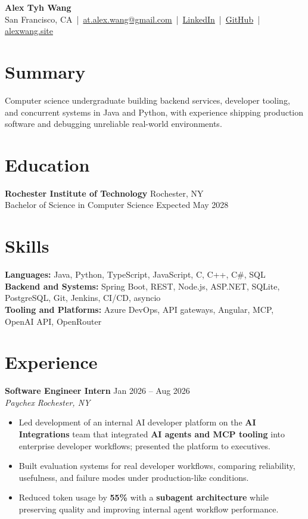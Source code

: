 \documentclass[10pt,letterpaper]{article}
\newif\ifresumeFirstRole
\newcommand{\resumeRole}[4]{%
  \ifresumeFirstRole
    \global\resumeFirstRolefalse
  \else
    \vspace{0pt plus 1fill}%
  \fi
  \textbf{#1} \hfill #2\\
  \textit{#3} \hfill \textit{#4}
}
\begin{document}
\begin{center}
{\Large \textbf{Alex Tyh Wang}}\\
San Francisco, CA \,|\, \href{mailto:at.alex.wang@gmail.com}{at.alex.wang@gmail.com} \,|\, \href{https://www.linkedin.com/in/alex-tyh-wang/}{LinkedIn} \,|\, \href{https://github.com/alextyhwang}{GitHub} \,|\, \href{https://alexwang.site}{alexwang.site}
\end{center}

\section*{Summary}
Computer science undergraduate building backend services, developer tooling, and concurrent systems in Java and Python, with experience shipping production software and debugging unreliable real-world environments.

\section*{Education}
\textbf{Rochester Institute of Technology} \hfill Rochester, NY\\
Bachelor of Science in Computer Science \hfill Expected May 2028

\section*{Skills}
\textbf{Languages:} Java, Python, TypeScript, JavaScript, C, C++, C\#, SQL\\
\textbf{Backend and Systems:} Spring Boot, REST, Node.js, ASP.NET, SQLite, PostgreSQL, Git, Jenkins, CI/CD, asyncio\\
\textbf{Tooling and Platforms:} Azure DevOps, API gateways, Angular, MCP, OpenAI API, OpenRouter

\section*{Experience}
\resumeRole{Software Engineer Intern}{Jan 2026 -- Aug 2026}{Paychex}{Rochester, NY}
\begin{itemize}
  \item Led development of an internal AI developer platform on the \textbf{AI Integrations} team that integrated \textbf{AI agents and MCP tooling} into enterprise developer workflows; presented the platform to executives.
  \item Built evaluation systems for real developer workflows, comparing reliability, usefulness, and failure modes under production-like conditions.
  \item Reduced token usage by \textbf{55\%} with a \textbf{subagent architecture} while preserving quality and improving internal agent workflow performance.
\end{itemize}
\end{document}
